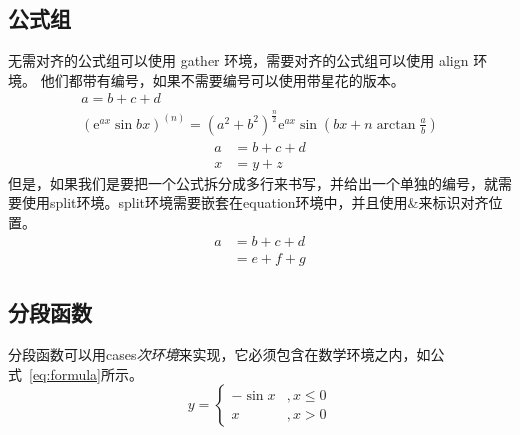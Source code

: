 \subsection{公式组}
无需对齐的公式组可以使用 gather 环境，需要对齐的公式组可以使用 align 环境。
他们都带有编号，如果不需要编号可以使用带星花的版本。
\begin{gather}
    a = b+c+d \\
    (\mathrm{e}^{ax}\sin bx)^{(n)}=(a^2+b^2)^{\frac{n}{2}}\mathrm{e}^{ax}\sin (bx+n\arctan\frac{a}{b})
\end{gather}
\begin{align*}
    a &= b+c+d \\
    x &= y+z
\end{align*}
但是，如果我们是要把一个公式拆分成多行来书写，并给出一个单独的编号，就需要使用split环境。split环境需要嵌套在equation环境中，并且使用\&来标识对齐位置。
\begin{equation}
    \begin{split}
        a &= b+c+d \\
          &= e+f+g
    \end{split}
\end{equation}
\subsection{分段函数}
分段函数可以用cases\textit{次环境}来实现，它必须包含在数学环境之内，如公式~\ref{eq:formula}所示。
\begin{equation}
    \label{eq:formula}
    y=
    \begin{cases}
        -\sin{x}    &,x \leqslant 0 \\
        x           &,x>0
    \end{cases} 
\end{equation}